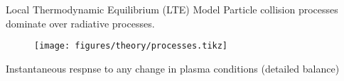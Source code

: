 \documentclass[]{beamer}
\begin{document}
\begin{frame}{Local Thermodynamic Equilibrium (LTE) Model}
  Particle collision processes dominate over radiative processes.
  \begin{figure}
    \texttt{[image: figures/theory/processes.tikz]}
  \end{figure}


  Instantaneous respnse to any change in plasma conditions (detailed balance)
\end{frame}


\end{document}
